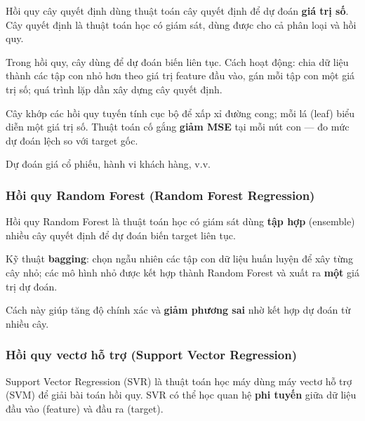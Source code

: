 \begin{dinhnghia}[title={Hồi quy cây quyết định}]
Hồi quy cây quyết định dùng thuật toán cây quyết định để dự đoán \textbf{giá trị số}.
Cây quyết định là thuật toán học có giám sát, dùng được cho cả phân loại và hồi quy.
\end{dinhnghia}

\begin{phuongphap}[title={Cách hoạt động}]
Trong hồi quy, cây dùng để dự đoán biến liên tục.
Cách hoạt động: chia dữ liệu thành các tập con nhỏ hơn theo giá trị feature đầu vào, gán mỗi tập con một giá trị số; quá trình lặp dần xây dựng cây quyết định.

Cây khớp các hồi quy tuyến tính cục bộ để xấp xỉ đường cong; mỗi lá (leaf) biểu diễn một giá trị số.
Thuật toán cố gắng \textbf{giảm MSE} tại mỗi nút con --- đo mức dự đoán lệch so với target gốc.
\end{phuongphap}

\begin{ynghia}[title={Ứng dụng}]
Dự đoán giá cổ phiếu, hành vi khách hàng, v.v.
\end{ynghia}

\subsubsection{Hồi quy Random Forest (Random Forest Regression)}

\begin{dinhnghia}[title={Hồi quy Random Forest}]
Hồi quy Random Forest là thuật toán học có giám sát dùng \textbf{tập hợp} (ensemble) nhiều cây quyết định để dự đoán biến target liên tục.
\end{dinhnghia}

\begin{phuongphap}[title={Bagging}]
Kỹ thuật \textbf{bagging}: chọn ngẫu nhiên các tập con dữ liệu huấn luyện để xây từng cây nhỏ; các mô hình nhỏ được kết hợp thành Random Forest và xuất ra \textbf{một} giá trị dự đoán.

Cách này giúp tăng độ chính xác và \textbf{giảm phương sai} nhờ kết hợp dự đoán từ nhiều cây.
\end{phuongphap}

\subsubsection{Hồi quy vectơ hỗ trợ (Support Vector Regression)}

\begin{dinhnghia}[title={SVR}]
Support Vector Regression (SVR) là thuật toán học máy dùng máy vectơ hỗ trợ (SVM) để giải bài toán hồi quy.
SVR có thể học quan hệ \textbf{phi tuyến} giữa dữ liệu đầu vào (feature) và đầu ra (target).
\end{dinhnghia}

